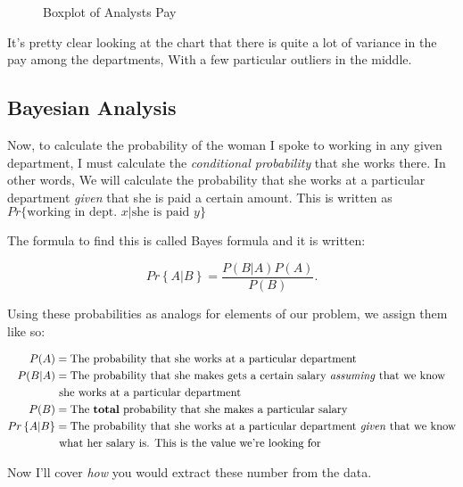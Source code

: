 \documentclass[letterpaper]{article}
\theoremstyle{definition}
\begin{document}
    
    

\begin{figure}[H]
	\center
	\caption{Boxplot of Analysts Pay}
	\label{fig:1}
\end{figure}
    
    It's pretty clear looking at the chart that there is quite a lot of
variance in the pay among the departments, With a few particular
outliers in the middle.


\hypertarget{step-3-in-comes-the-bayes}{%
\subsection{Bayesian Analysis}\label{step-3-in-comes-the-bayes}}

Now, to calculate the probability of the woman I spoke to working in any given department,
I must calculate the \emph{conditional probability} that she works there. In other words,
We will calculate the probability that she works at a particular department \emph{given}
that she is paid a certain amount. This is written as $Pr\{\text{working in dept. }x | \text{she is paid }y\}$

The formula to find this is called Bayes formula and it is written:

\[
Pr \left\{ A|B \right\} = \frac{P(B|A)P(A)}{P(B)}
.\] 

Using these probabilities as analogs for elements of our problem, we assign them like so:

\begin{align*}
	P(A) &= \text{The probability that she works at a particular department}\\
	P(B|A) &= \text{The probability that she makes gets a certain salary \emph{assuming}
	that we know} \\ &\text{ she works at a particular department}\\
	P(B) &= \text{The \textbf{total} probability that she makes a particular salary}\\
	Pr\left\{ A|B \right\} &= \text{The probability that she works at a particular
	department \emph{given} that we know} \\ &\text{ what her salary is. This is the value we're
	looking for}
\end{align*}

Now I'll cover \emph{how} you would extract these number from the data.
\end{document}
